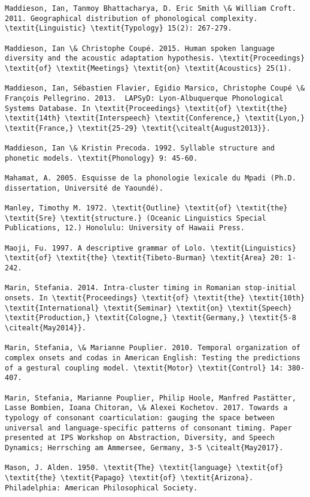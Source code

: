 \begin{verbatim}
Maddieson, Ian, Tanmoy Bhattacharya, D. Eric Smith \& William Croft. 2011. Geographical distribution of phonological complexity. \textit{Linguistic} \textit{Typology} 15(2): 267-279.

Maddieson, Ian \& Christophe Coupé. 2015. Human spoken language diversity and the acoustic adaptation hypothesis. \textit{Proceedings} \textit{of} \textit{Meetings} \textit{on} \textit{Acoustics} 25(1).

Maddieson, Ian, Sébastien Flavier, Egidio Marsico, Christophe Coupé \& François Pellegrino. 2013.  LAPSyD: Lyon-Albuquerque Phonological Systems Database. In \textit{Proceedings} \textit{of} \textit{the} \textit{14th} \textit{Interspeech} \textit{Conference,} \textit{Lyon,} \textit{France,} \textit{25-29} \textit{\citealt{August2013}}.

Maddieson, Ian \& Kristin Precoda. 1992. Syllable structure and phonetic models. \textit{Phonology} 9: 45-60.

Mahamat, A. 2005. Esquisse de la phonologie lexicale du Mpadi (Ph.D. dissertation, Université de Yaoundé).

Manley, Timothy M. 1972. \textit{Outline} \textit{of} \textit{the} \textit{Sre} \textit{structure.} (Oceanic Linguistics Special Publications, 12.) Honolulu: University of Hawaii Press.

Maoji, Fu. 1997. A descriptive grammar of Lolo. \textit{Linguistics} \textit{of} \textit{the} \textit{Tibeto-Burman} \textit{Area} 20: 1-242.

Marin, Stefania. 2014. Intra-cluster timing in Romanian stop-initial onsets. In \textit{Proceedings} \textit{of} \textit{the} \textit{10th} \textit{International} \textit{Seminar} \textit{on} \textit{Speech} \textit{Production,} \textit{Cologne,} \textit{Germany,} \textit{5-8 \citealt{May2014}}.

Marin, Stefania, \& Marianne Pouplier. 2010. Temporal organization of complex onsets and codas in American English: Testing the predictions of a gestural coupling model. \textit{Motor} \textit{Control} 14: 380-407.

Marin, Stefania, Marianne Pouplier, Philip Hoole, Manfred Pastätter, Lasse Bombien, Ioana Chitoran, \& Alexei Kochetov. 2017. Towards a typology of consonant coarticulation: gauging the space between universal and language-specific patterns of consonant timing. Paper presented at IPS Workshop on Abstraction, Diversity, and Speech Dynamics; Herrsching am Ammersee, Germany, 3-5 \citealt{May2017}.

Mason, J. Alden. 1950. \textit{The} \textit{language} \textit{of} \textit{the} \textit{Papago} \textit{of} \textit{Arizona}. Philadelphia: American Philosophical Society.


\end{verbatim}
